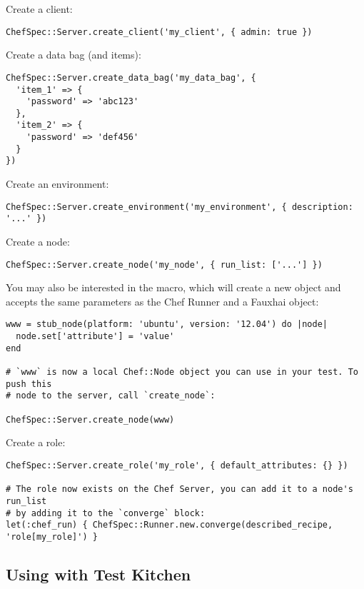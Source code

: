 Create a client:

\begin{lstlisting}[label=lst:testing-chef-zero6]
ChefSpec::Server.create_client('my_client', { admin: true })
\end{lstlisting}

Create a data bag (and items):

\begin{lstlisting}[label=lst:testing-chef-zero7]
ChefSpec::Server.create_data_bag('my_data_bag', {
  'item_1' => {
    'password' => 'abc123'
  },
  'item_2' => {
    'password' => 'def456'
  }
})
\end{lstlisting}

Create an environment:

\begin{lstlisting}[label=lst:testing-chef-zero8]
ChefSpec::Server.create_environment('my_environment', { description: '...' })
\end{lstlisting}

Create a node:

\begin{lstlisting}[label=lst:testing-chef-zero9]
ChefSpec::Server.create_node('my_node', { run_list: ['...'] })
\end{lstlisting}

You may also be interested in the  macro, which will create a new  object and accepts the same parameters as the Chef Runner and a Fauxhai object:

\begin{lstlisting}[label=lst:testing-chef-zero10]
www = stub_node(platform: 'ubuntu', version: '12.04') do |node|
  node.set['attribute'] = 'value'
end

# `www` is now a local Chef::Node object you can use in your test. To push this
# node to the server, call `create_node`:

ChefSpec::Server.create_node(www)
\end{lstlisting}

Create a role:

\begin{lstlisting}[label=lst:testing-chef-zero11]
ChefSpec::Server.create_role('my_role', { default_attributes: {} })

# The role now exists on the Chef Server, you can add it to a node's run_list
# by adding it to the `converge` block:
let(:chef_run) { ChefSpec::Runner.new.converge(described_recipe, 'role[my_role]') }
\end{lstlisting}



\subsection{Using with Test Kitchen}
